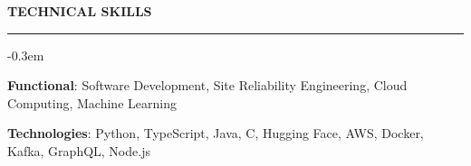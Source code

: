 \documentclass{cv}
\begin{document}

\sectionskip


 \textbf{TECHNICAL SKILLS}
\sectionlineskip
\hrule
\begin{list}{}{\setlength{\leftmargin}{0em}}
\itemsep -0.3em
\item[]
    \textbf{Functional}: Software Development, Site Reliability Engineering, Cloud Computing, Machine Learning
\item[]
    \textbf{Technologies}: Python, TypeScript, Java, C,  Hugging Face, AWS, Docker, Kafka, GraphQL, Node.js
\end{list}


\sectionskip

\end{document}
